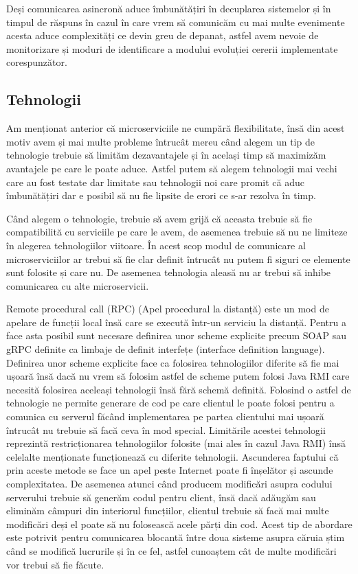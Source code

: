 Deși comunicarea asincronă aduce îmbunătățiri în decuplarea sistemelor și în timpul de răspuns
în cazul în care vrem să comunicăm cu mai multe evenimente acesta aduce complexități ce devin
greu de depanat, astfel avem nevoie de monitorizare și moduri de identificare a modului
evoluției cererii implementate corespunzător.

\subsection{Tehnologii}

Am menționat anterior că microserviciile ne cumpără flexibilitate, însă din acest motiv avem
și mai multe probleme întrucât mereu când alegem un tip de tehnologie trebuie să limităm
dezavantajele și în același timp să maximizăm avantajele pe care le poate aduce. Astfel putem să alegem
tehnologii mai vechi care au fost testate dar limitate sau tehnologii noi care promit că aduc îmbunătățiri
dar e posibil să nu fie lipsite de erori ce s-ar rezolva în timp.

Când alegem o tehnologie, trebuie să avem grijă că aceasta trebuie să fie compatibilită cu
serviciile pe care le avem, de asemenea trebuie să nu ne limiteze în alegerea tehnologiilor viitoare.
În acest scop modul de comunicare al microserviciilor ar trebui să fie clar definit întrucât 
nu putem fi siguri ce elemente sunt folosite și care nu. De asemenea tehnologia aleasă
nu ar trebui să inhibe comunicarea cu alte microservicii.

Remote procedural call (RPC) (Apel procedural la distanță) este un mod de apelare de funcții local
însă care se execută într-un serviciu la distanță. Pentru a face asta posibil sunt necesare 
definirea unor scheme explicite precum SOAP sau gRPC definite ca limbaje de definit interfețe
(interface definition language). Definirea unor scheme explicite face ca folosirea tehnologiilor
diferite să fie mai ușoară însă dacă nu vrem să folosim astfel de scheme putem folosi Java RMI
care necesită folosirea aceleași tehnologii însă fără schemă definită. Folosind o astfel de tehnologie
ne permite generare de cod pe care clientul le poate folosi pentru a comunica cu serverul 
făcând implementarea pe partea clientului mai ușoară întrucât nu trebuie să facă ceva în mod special.
Limitările acestei tehnologii reprezintă restricționarea tehnologiilor folosite (mai ales în cazul
Java RMI) însă celelalte menționate funcționează cu diferite tehnologii. Ascunderea faptului
că prin aceste metode se face un apel peste Internet poate fi înșelător și ascunde complexitatea.
De asemenea atunci când producem modificări asupra codului serverului trebuie să generăm codul
pentru client, însă dacă adăugăm sau eliminăm câmpuri din interiorul funcțiilor, clientul trebuie 
să facă mai multe modificări deși el poate să nu folosească acele părți din cod. Acest tip de abordare
este potrivit pentru comunicarea blocantă între doua sisteme asupra căruia știm când se modifică lucrurile și 
în ce fel, astfel cunoaștem cât de multe modificări vor trebui să fie făcute.

